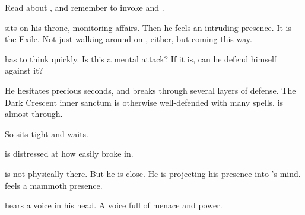
\begin{comment}
  \section{Psyrex and Ishnaruchaefir}
\end{comment}
\begin{comment}
  \subsection{Psyrex feels Ishnaruchaefir}
\end{comment}

Read about , and remember to invoke \Sethicus and \Tiamat. 

\Psyrex sits on his throne, monitoring affairs. 
Then he feels an intruding presence. 
It is the Exile. 
Not just walking around on \Azmith, either, but coming this way.

\Psyrex has to think quickly.
Is this a mental attack?
If it is, can he defend himself against it?

He hesitates precious seconds, and \Ishnaruchaefir breaks through several layers of defense.
The Dark Crescent inner sanctum is otherwise well-defended with many spells. 
\Ishnaruchaefir is almost through.


So \Psyrex sits tight and waits. 

\Psyrex is distressed at how easily \Ishnaruchaefir broke in. 

\Ishnaruchaefir is not physically there. 
But he is close.
He is projecting his presence into \Psyrex's mind. 
\Psyrex feels a mammoth presence.



\begin{comment}
  \subsection{Ishnaruchaefir talks to Psyrex}
\end{comment}

\Psyrex hears a voice in his head.
A \draconian voice full of menace and power. 

